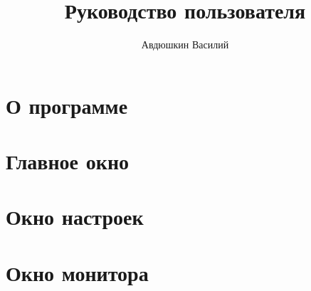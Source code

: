 \documentclass[a4paper,12pt,fleqn]{article}
\author{Авдюшкин Василий}
\title{Руководство пользователя}
\begin{document}
\pagestyle{empty}
\maketitle
\newpage
\pagestyle{plain}
\tableofcontents
\newpage

\section{О программе}



\section{Главное окно}



\section{Окно настроек}



\section{Окно монитора}




%
\end{document}
